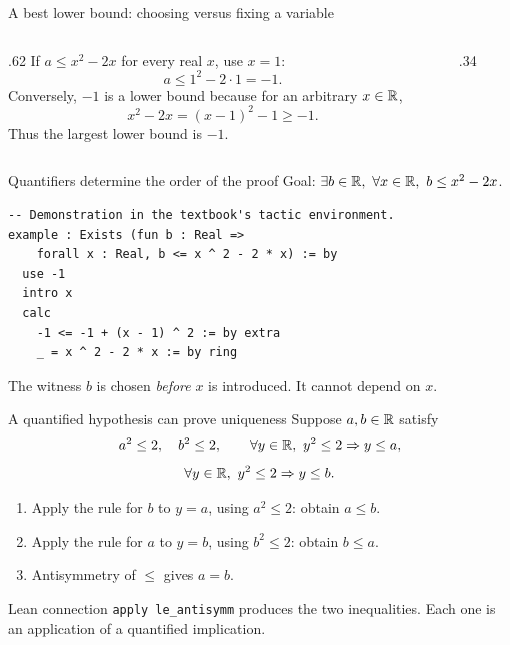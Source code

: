\begin{frame}{A best lower bound: choosing versus fixing a variable}
\begin{columns}[T]
\begin{column}{.62\textwidth}
If $a\le x^2-2x$ for every real $x$, use $x=1$:
\[
a\le 1^2-2\cdot1=-1.
\]
Conversely, $-1$ is a lower bound because for an arbitrary $x\in\mathbb{R}$,
\[
x^2-2x=(x-1)^2-1\ge -1.
\]
Thus the largest lower bound is $-1$.
\end{column}
\begin{column}{.34\textwidth}
\end{column}
\end{columns}
\end{frame}

\begin{frame}[fragile]{Quantifiers determine the order of the proof}
Goal: $\exists b\in\mathbb{R},\ \forall x\in\mathbb{R},\ b\le x^2-2x$.
\begin{lstlisting}
-- Demonstration in the textbook's tactic environment.
example : Exists (fun b : Real =>
    forall x : Real, b <= x ^ 2 - 2 * x) := by
  use -1
  intro x
  calc
    -1 <= -1 + (x - 1) ^ 2 := by extra
    _ = x ^ 2 - 2 * x := by ring
\end{lstlisting}
The witness $b$ is chosen \emph{before} $x$ is introduced. It cannot depend on $x$.
\end{frame}

\begin{frame}{A quantified hypothesis can prove uniqueness}
Suppose $a,b\in\mathbb{R}$ satisfy
\[
a^2\le2,\quad b^2\le2,\qquad
\forall y\in\mathbb{R},\ y^2\le2\Rightarrow y\le a,
\]
\[
\forall y\in\mathbb{R},\ y^2\le2\Rightarrow y\le b.
\]
\begin{enumerate}
\item Apply the rule for $b$ to $y=a$, using $a^2\le2$: obtain $a\le b$.
\item Apply the rule for $a$ to $y=b$, using $b^2\le2$: obtain $b\le a$.
\item Antisymmetry of $\le$ gives $a=b$.
\end{enumerate}
\begin{block}{Lean connection}
\texttt{apply le\_antisymm} produces the two inequalities. Each one is an application of a quantified implication.
\end{block}
\end{frame}

